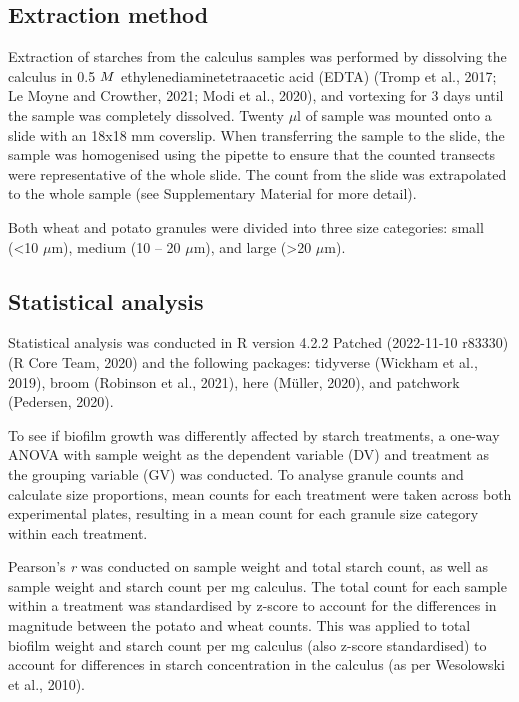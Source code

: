 \documentclass[utf8]{../templates/frontiersSCNS}
\begin{document}
\hypertarget{extraction-method}{%
\subsection{Extraction method}\label{extraction-method}}

Extraction of starches from the calculus samples was performed by dissolving the
calculus in 0.5 \(\tiny{M}\) ethylenediaminetetraacetic acid (EDTA)
(Tromp et al., 2017; Le Moyne and Crowther, 2021; Modi et al., 2020),
and vortexing for 3 days until the sample was completely dissolved.
Twenty \(\mu\)l of sample was mounted onto a slide with an 18x18 mm coverslip.
When transferring the sample to the slide, the sample was homogenised using
the pipette to ensure that the counted transects were representative of the
whole slide. The count from the slide was extrapolated to the whole sample
(see Supplementary Material for more detail).

Both wheat and potato granules were divided into three size categories:
small (\textless10 \(\mu\)m), medium (10 -- 20 \(\mu\)m), and large (\textgreater20 \(\mu\)m).

\hypertarget{statistical-analysis}{%
\subsection{Statistical analysis}\label{statistical-analysis}}

Statistical analysis was conducted in R version 4.2.2 Patched (2022-11-10 r83330) (R Core Team, 2020) and
the following packages: tidyverse (Wickham et al., 2019), broom (Robinson et al., 2021),
here (Müller, 2020), and patchwork (Pedersen, 2020).

To see if biofilm growth was differently affected by starch treatments, a
one-way ANOVA with sample weight as the dependent variable (DV) and treatment
as the grouping variable (GV) was conducted.
To analyse granule counts and calculate size proportions, mean counts for each
treatment were taken across
both experimental plates, resulting in a mean count for each
granule size category within each treatment.

Pearson's \emph{r} was conducted on sample weight and total starch count, as well as sample
weight and starch count per mg calculus. The total count for each sample within a
treatment was standardised by z-score to account for the differences in magnitude
between the potato and wheat counts.
This was applied to total biofilm weight and starch count per mg
calculus (also z-score standardised) to account for differences in starch
concentration in the calculus (as per Wesolowski et al., 2010).
\end{document}
